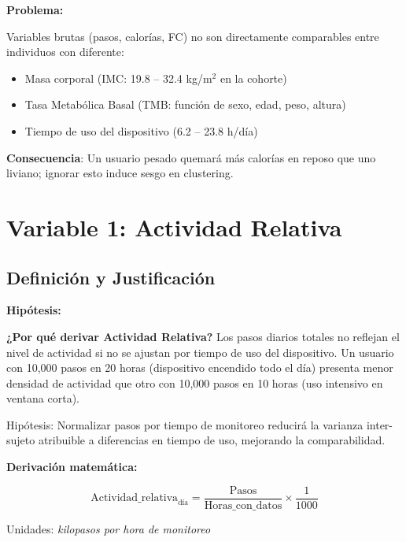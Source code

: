 \documentclass[12pt,letterpaper,twoside]{report}
\begin{document}
\begin{calculobox}
\begin{hipotesisbox}
\textbf{Problema:}

Variables brutas (pasos, calorías, FC) no son directamente comparables entre individuos con diferente:
\begin{itemize}[noitemsep]
    \item Masa corporal (IMC: 19.8 -- 32.4 kg/m$^2$ en la cohorte)
    \item Tasa Metabólica Basal (TMB: función de sexo, edad, peso, altura)
    \item Tiempo de uso del dispositivo (6.2 -- 23.8 h/día)
\end{itemize}

\textbf{Consecuencia}: Un usuario pesado quemará más calorías en reposo que uno liviano; ignorar esto induce sesgo en clustering.
\end{hipotesisbox}

\section{Variable 1: Actividad Relativa}

\subsection{Definición y Justificación}

\begin{hipotesisbox}
\textbf{Hipótesis:}

\textbf{¿Por qué derivar Actividad Relativa?} Los pasos diarios totales no reflejan el nivel de actividad si no se ajustan por tiempo de uso del dispositivo. Un usuario con 10,000 pasos en 20 horas (dispositivo encendido todo el día) presenta menor densidad de actividad que otro con 10,000 pasos en 10 horas (uso intensivo en ventana corta).

Hipótesis: Normalizar pasos por tiempo de monitoreo reducirá la varianza inter-sujeto atribuible a diferencias en tiempo de uso, mejorando la comparabilidad.
\end{hipotesisbox}

\begin{estadisticobox}
\textbf{Derivación matemática:}

\begin{equation}
\text{Actividad\_relativa}_{\text{día}} = \frac{\text{Pasos}}{\text{Horas\_con\_datos}} \times \frac{1}{1000}
\end{equation}

Unidades: \textit{kilopasos por hora de monitoreo}


\end{estadisticobox}
\end{calculobox}
\end{document}
